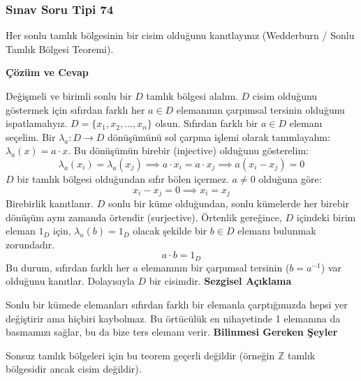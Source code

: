 \documentclass[11pt, a4paper]{article}
\newenvironment{cozum}{
    \vspace{0.5cm}
    \noindent\textcolor{green!60!black}{\faCheckCircle\enspace \textbf{\Large Çözüm ve Cevap}}\par\vspace{0.2cm}
}{}
\newenvironment{sezgisel}{
    \vspace{0.5cm}
    \noindent\textcolor{orange!80!black}{\faLightbulb\enspace \textbf{\Large Sezgisel Açıklama}}\par\vspace{0.2cm}
    \itshape
}{}
\newenvironment{bilgi}{
    \vspace{0.5cm}
    \noindent\textcolor{red!70!black}{\faExclamationTriangle\enspace \textbf{\Large Bilinmesi Gereken Şeyler}}\par\vspace{0.2cm}
}{}
\begin{document}
\subsubsection{Sınav Soru Tipi 74}
\begin{sinavbox}
Her sonlu tamlık bölgesinin bir cisim olduğunu kanıtlayınız (Wedderburn / Sonlu Tamlık Bölgesi Teoremi).
\end{sinavbox}
\begin{cozum}
Değişmeli ve birimli sonlu bir $D$ tamlık bölgesi alalım. $D$ cisim olduğunu göstermek için sıfırdan farklı her $a \in D$ elemanının çarpımsal tersinin olduğunu ispatlamalıyız.
$D = \{x_1, x_2, \dots, x_n\}$ olsun. Sıfırdan farklı bir $a \in D$ elemanı seçelim.
Bir $\lambda_a: D \to D$ dönüşümünü sol çarpma işlemi olarak tanımlayalım: $\lambda_a(x) = a \cdot x$.
Bu dönüşümün birebir (injective) olduğunu gösterelim:
\[ \lambda_a(x_i) = \lambda_a(x_j) \implies a \cdot x_i = a \cdot x_j \implies a(x_i - x_j) = 0 \]
$D$ bir tamlık bölgesi olduğundan sıfır bölen içermez. $a \neq 0$ olduğuna göre:
\[ x_i - x_j = 0 \implies x_i = x_j \]
Birebirlik kanıtlanır. $D$ sonlu bir küme olduğundan, sonlu kümelerde her birebir dönüşüm aynı zamanda örtendir (surjective).
Örtenlik gereğince, $D$ içindeki birim eleman $1_D$ için, $\lambda_a(b) = 1_D$ olacak şekilde bir $b \in D$ elemanı bulunmak zorundadır.
\[ a \cdot b = 1_D \]
Bu durum, sıfırdan farklı her $a$ elemanının bir çarpımsal tersinin ($b = a^{-1}$) var olduğunu kanıtlar. Dolayısıyla $D$ bir cisimdir.
\end{cozum}
\begin{sezgisel}
Sonlu bir kümede elemanları sıfırdan farklı bir elemanla çarptığımızda hepsi yer değiştirir ama hiçbiri kaybolmaz. Bu örtücülük en nihayetinde 1 elemanına da basmamızı sağlar, bu da bize ters elemanı verir.
\end{sezgisel}
\begin{bilgi}
Sonsuz tamlık bölgeleri için bu teorem geçerli değildir (örneğin $\mathbb{Z}$ tamlık bölgesidir ancak cisim değildir).
\end{bilgi}

\newpage
\end{document}
